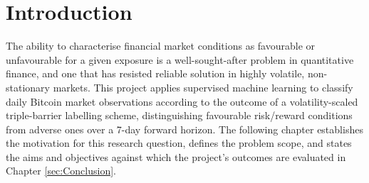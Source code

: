 
\section{Introduction}
\label{sec:Introduction} 
The ability to characterise financial market conditions as favourable or unfavourable for a given exposure is a well-sought-after problem in quantitative finance, and one that has resisted reliable solution in highly volatile, non-stationary markets. This project applies supervised machine learning to classify daily Bitcoin market observations according to the outcome of a volatility-scaled triple-barrier labelling scheme, distinguishing favourable risk/reward conditions from adverse ones over a 7-day forward horizon. The following chapter establishes the motivation for this research question, defines the problem scope, and states the aims and objectives against which the project's outcomes are evaluated in Chapter \ref{sec:Conclusion}.
